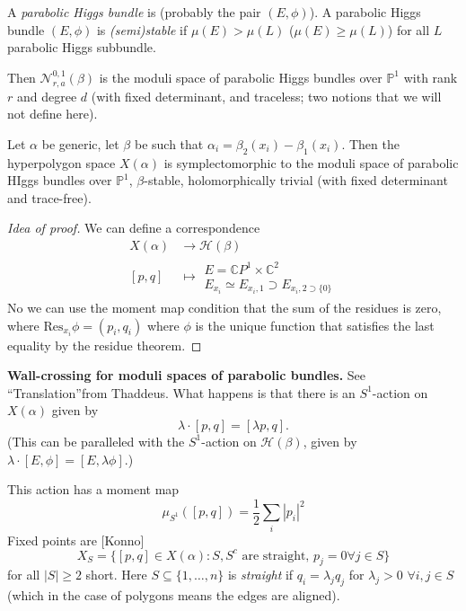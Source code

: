 A {\it parabolic Higgs bundle} is (probably the pair $(E,\phi)$).
A parabolic Higgs bundle $(E,\phi)$ is {\it (semi)stable}
if  $\mu(E) > \mu(L)$ ($\mu(E) \geq \mu(L)$) for all 
$L$ parabolic Higgs subbundle.

Then $\mathcal{N}_{r,a}^{0,1}(\beta)$ is the moduli
space of parabolic Higgs bundles over $\mathbb{P}^1$ 
with rank $r$ and degree $d$ (with fixed determinant,
and traceless; two notions that we will not define here).


\begin{theorem}
\label{theorem-GBSFG}
Let $\alpha$ be generic, let $\beta$ 
be such that $\alpha_i=\beta_2(x_i)-\beta_1(x_i)$.
Then the hyperpolygon space $X(\alpha)$ 
is symplectomorphic to the moduli space
of parabolic HIggs bundles over $\mathbb{P}^1$, $\beta$-stable,
holomorphically trivial (with fixed determinant and trace-free).


\begin{proof}[Idea of proof]
We can define a correspondence
\begin{align*}
X(\alpha) &\longrightarrow \mathcal{H}(\beta) \\
[p,q] &\longmapsto \substack{E=\mathbb{C}P^{1}\times \mathbb{C}^2
 \\ E_{x_i}\simeq E_{x_i,1}\supset E_{x_i,2\supset \{0\}}}
\end{align*}
No we can use the moment map condition
that the sum of the residues is zero,
where $\text{Res}_{x_i}\phi=(p_i,q_i)$
where $\phi$ is the unique function
that satisfies the last equality by
the residue theorem.
\end{proof}
\end{theorem}

\medskip\noindent
{\bf Wall-crossing for moduli spaces of parabolic bundles.}
See ``Translation''from Thaddeus.
What happens is that there is an $S^1$-action on $X(\alpha)$ given by
$$
\lambda\cdot[p,q]=[\lambda p,q].
$$
(This can be paralleled with the $S^1$-action on $\mathcal{H}(\beta)$,
given by $\lambda\cdot[E,\phi]=[E,\lambda\phi]$.)

This action has a moment map
$$
\mu_{S^1}([p,q])=\frac{1}{2}\sum_{i}|p_i|^2
$$
Fixed points are [Konno]
$$
X_S=\{[p,q] \in X(\alpha):
S,S^c \text{ are straight, }p_j=0 \forall j \in S\}
$$
for all $|S|\geq 2$ short. Here $S\subseteq \{1,\ldots,n\}$ 
is {\it straight} if $q_i=\lambda_j q_j$
for $\lambda_j>0$ $\forall  i,j \in S$ 
(which in the case of polygons means the edges are aligned).

